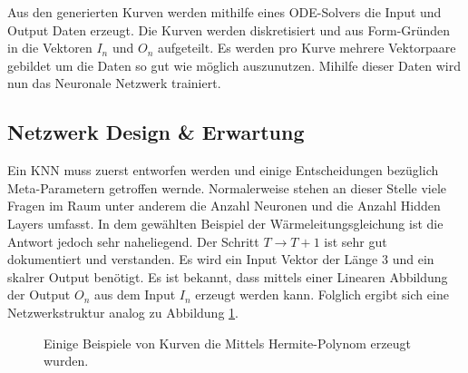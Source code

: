 Aus den generierten Kurven werden mithilfe eines ODE-Solvers die Input und Output Daten erzeugt. Die Kurven werden diskretisiert und aus Form-Gründen in die Vektoren $I_n$ und $O_n$ aufgeteilt. Es werden pro Kurve mehrere Vektorpaare gebildet um die Daten so gut wie möglich auszunutzen. Mihilfe dieser Daten wird nun das Neuronale Netzwerk trainiert.

\subsection{Netzwerk Design \& Erwartung}
Ein KNN muss zuerst entworfen werden und einige Entscheidungen bezüglich Meta-Parametern getroffen wernde. Normalerweise stehen an dieser Stelle viele Fragen im Raum unter anderem die Anzahl Neuronen und die Anzahl Hidden Layers umfasst. In dem gewählten Beispiel der Wärmeleitungsgleichung ist die Antwort jedoch sehr naheliegend. Der Schritt $T \rightarrow T+1$ ist sehr gut dokumentiert und verstanden. Es wird ein Input Vektor der Länge 3 und ein skalrer Output benötigt. Es ist bekannt, dass mittels einer Linearen Abbildung der Output $O_n$ aus dem Input $I_n$ erzeugt werden kann. Folglich ergibt sich eine Netzwerkstruktur analog zu Abbildung \ref{fig:mst_neuronalnetworkdemo}.

\begin{figure}
	\centering
	
	\label{fig:mst_neuronalnetworkdemo}
	\caption{Einige Beispiele von Kurven die Mittels Hermite-Polynom erzeugt wurden.}
\end{figure}

